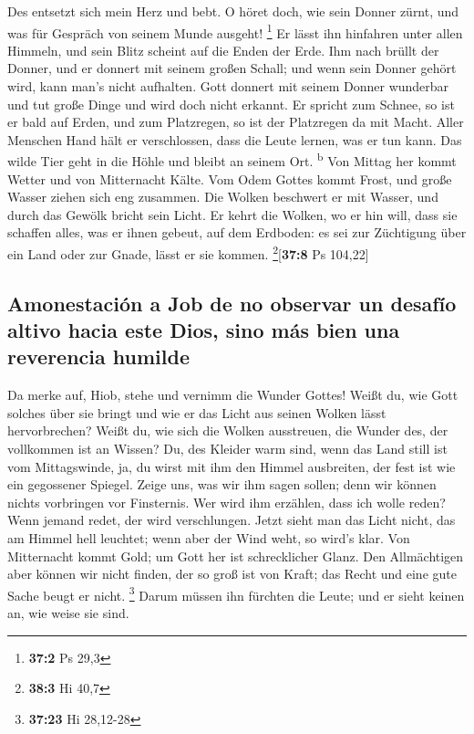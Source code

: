  Des entsetzt sich mein Herz und bebt.  O
höret doch, wie sein Donner zürnt, und was für Gespräch von seinem Munde
ausgeht! \footnote{\textbf{37:2} Ps 29,3}  Er lässt ihn
hinfahren unter allen Himmeln, und sein Blitz scheint auf die Enden der
Erde.  Ihm nach brüllt der Donner, und er donnert mit
seinem großen Schall; und wenn sein Donner gehört wird, kann man's nicht
aufhalten.  Gott donnert mit seinem Donner wunderbar und
tut große Dinge und wird doch nicht erkannt.  Er spricht
zum Schnee, so ist er bald auf Erden, und zum Platzregen, so ist der
Platzregen da mit Macht.  Aller Menschen Hand hält er
verschlossen, dass die Leute lernen, was er tun kann.  Das
wilde Tier geht in die Höhle und bleibt an seinem Ort.
\textsuperscript{b}  Von Mittag her kommt Wetter und von
Mitternacht Kälte.  Vom Odem Gottes kommt Frost, und
große Wasser ziehen sich eng zusammen.  Die Wolken
beschwert er mit Wasser, und durch das Gewölk bricht sein Licht.
 Er kehrt die Wolken, wo er hin will, dass sie schaffen
alles, was er ihnen gebeut, auf dem Erdboden:  es sei zur
Züchtigung über ein Land oder zur Gnade, lässt er sie kommen.
\footnote{\textbf{38:3} Hi 40,7}{[}\textbf{37:8} Ps 104,22{]}

\hypertarget{amonestaciuxf3n-a-job-de-no-observar-un-desafuxedo-altivo-hacia-este-dios-sino-muxe1s-bien-una-reverencia-humilde}{%
\subsection{Amonestación a Job de no observar un desafío altivo hacia
este Dios, sino más bien una reverencia
humilde}\label{amonestaciuxf3n-a-job-de-no-observar-un-desafuxedo-altivo-hacia-este-dios-sino-muxe1s-bien-una-reverencia-humilde}}

 Da merke auf, Hiob, stehe und vernimm die Wunder Gottes!
 Weißt du, wie Gott solches über sie bringt und wie er
das Licht aus seinen Wolken lässt hervorbrechen?  Weißt
du, wie sich die Wolken ausstreuen, die Wunder des, der vollkommen ist
an Wissen?  Du, des Kleider warm sind, wenn das Land
still ist vom Mittagswinde,  ja, du wirst mit ihm den
Himmel ausbreiten, der fest ist wie ein gegossener Spiegel.
 Zeige uns, was wir ihm sagen sollen; denn wir können
nichts vorbringen vor Finsternis.  Wer wird ihm erzählen,
dass ich wolle reden? Wenn jemand redet, der wird verschlungen.
 Jetzt sieht man das Licht nicht, das am Himmel hell
leuchtet; wenn aber der Wind weht, so wird's klar.  Von
Mitternacht kommt Gold; um Gott her ist schrecklicher Glanz.
 Den Allmächtigen aber können wir nicht finden, der so
groß ist von Kraft; das Recht und eine gute Sache beugt er nicht.
\footnote{\textbf{37:23} Hi 28,12-28}  Darum müssen ihn
fürchten die Leute; und er sieht keinen an, wie weise sie sind.

